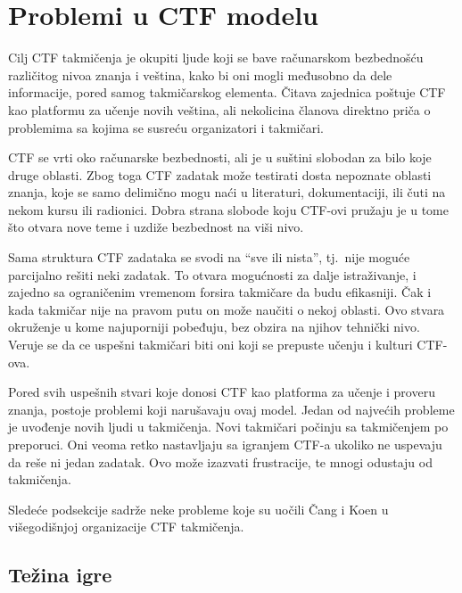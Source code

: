 \documentclass[12pt, a4paper, twocolumn]{article}
\begin{document}
\section{Problemi u CTF modelu}

Cilj CTF takmičenja je okupiti ljude koji se bave računarskom bezbednošću
različitog nivoa znanja i veština, kako bi oni mogli međusobno da dele
informacije, pored samog takmičarskog elementa. Čitava zajednica poštuje
CTF kao platformu za učenje novih veština, ali nekolicina članova direktno
priča o problemima sa kojima se susreću organizatori i takmičari.

CTF se vrti oko računarske bezbednosti, ali je u suštini slobodan za bilo koje
druge oblasti. Zbog toga CTF zadatak može testirati dosta nepoznate oblasti 
znanja, koje se samo delimično mogu naći u literaturi, dokumentaciji, ili čuti 
na nekom kursu ili radionici. Dobra strana slobode koju CTF-ovi pružaju je u 
tome što otvara nove teme i uzdiže bezbednost na viši nivo. 

Sama struktura CTF zadataka se svodi na ``sve ili nista'', tj.\ nije moguće
parcijalno rešiti neki zadatak. To otvara mogućnosti za dalje istraživanje, i
zajedno sa ograničenim vremenom forsira takmičare da budu efikasniji. Čak i
kada takmičar nije na pravom putu on može naučiti o nekoj oblasti. Ovo stvara
okruženje u kome najuporniji pobeđuju, bez obzira na njihov tehnički nivo.
Veruje se da ce uspešni takmičari biti oni koji se prepuste učenju i kulturi
CTF-ova.

Pored svih uspešnih stvari koje donosi CTF kao platforma za učenje i proveru
znanja, postoje problemi koji narušavaju ovaj model. Jedan od najvećih
probleme je uvođenje novih ljudi u takmičenja.\cite{ctf_chung} Novi takmičari
počinju sa takmičenjem po preporuci. Oni veoma retko nastavljaju sa igranjem
CTF-a ukoliko ne uspevaju da reše ni jedan zadatak. Ovo može izazvati 
frustracije, te mnogi odustaju od takmičenja.

Sledeće podsekcije sadrže neke probleme koje su uočili Čang i Koen 
\cite{ctf_chung} u višegodišnjoj organizacije CTF takmičenja.

\subsection{Težina igre}
\end{document}
